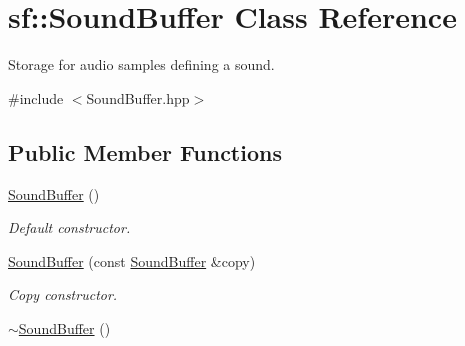 \hypertarget{classsf_1_1_sound_buffer}{\section{sf\+:\+:Sound\+Buffer Class Reference}
\label{classsf_1_1_sound_buffer}
}


Storage for audio samples defining a sound.  




{\ttfamily \#include $<$Sound\+Buffer.\+hpp$>$}

\subsection*{Public Member Functions}
\begin{DoxyCompactItemize}
\item 
\hypertarget{classsf_1_1_sound_buffer_a0cabfbfe19b831bf7d5c9592d92ef233}{\hyperlink{classsf_1_1_sound_buffer_a0cabfbfe19b831bf7d5c9592d92ef233}{Sound\+Buffer} ()}\label{classsf_1_1_sound_buffer_a0cabfbfe19b831bf7d5c9592d92ef233}

\begin{DoxyCompactList}\small\item\em Default constructor. \end{DoxyCompactList}\item 
\hyperlink{classsf_1_1_sound_buffer_aaf000fc741ff27015907e8588263f4a6}{Sound\+Buffer} (const \hyperlink{classsf_1_1_sound_buffer}{Sound\+Buffer} \&copy)
\begin{DoxyCompactList}\small\item\em Copy constructor. \end{DoxyCompactList}\item 
\hypertarget{classsf_1_1_sound_buffer_aea240161724ffba74a0d6a9e277d3cd5}{\hyperlink{classsf_1_1_sound_buffer_aea240161724ffba74a0d6a9e277d3cd5}{$\sim$\+Sound\+Buffer} ()}\label{classsf_1_1_sound_buffer_aea240161724ffba74a0d6a9e277d3cd5}


\end{DoxyCompactItemize}
